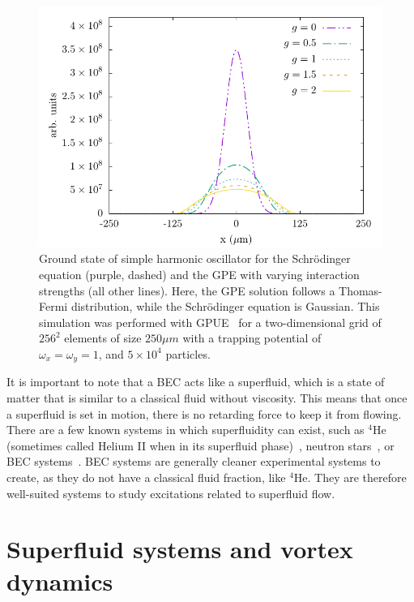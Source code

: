 \begin{figure}
\center \includegraphics[width = \textwidth]{data/qs/SHO/SHO.pdf}

\caption{Ground state of simple harmonic oscillator for the Schr\"odinger equation (purple, dashed) and the GPE with varying interaction strengths (all other lines).
Here, the GPE solution follows a Thomas-Fermi distribution, while the Schr\"odinger equation is Gaussian.
This simulation was performed with GPUE~\cite{schloss2018} for a two-dimensional grid of $256^2$ elements of size $250 \mu m$ with a trapping potential of $\omega_x = \omega_y = 1$, and $5\times 10^4$ particles.}
\label{fig:TF}
\end{figure}

It is important to note that a BEC acts like a superfluid, which is a state of matter that is similar to a classical fluid without viscosity.
This means that once a superfluid is set in motion, there is no retarding force to keep it from flowing.
There are a few known systems in which superfluidity can exist, such as $^4$He (sometimes called Helium II when in its superfluid phase)~\cite{allen1938}, neutron stars~\cite{migdal1960}, or BEC systems~\cite{einstein1925, anderson1995}.
BEC systems are generally cleaner experimental systems to create, as they do not have a classical fluid fraction, like $^4$He.
They are therefore well-suited systems to study excitations related to superfluid flow.

\section{Superfluid systems and vortex dynamics}

